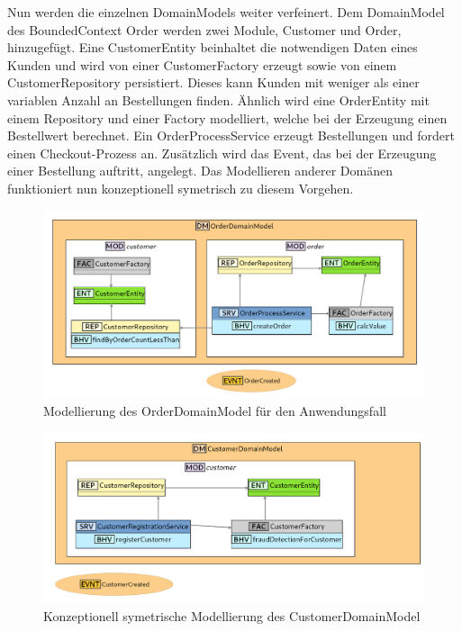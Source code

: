 \newpage

Nun werden die einzelnen DomainModels weiter verfeinert. Dem DomainModel des BoundedContext Order werden zwei Module, \glqq Customer\grqq{} und \glqq Order\grqq, hinzugefügt. Eine \glqq CustomerEntity\grqq{} beinhaltet die notwendigen Daten eines Kunden und wird von einer \glqq CustomerFactory\grqq{} erzeugt sowie von einem \glqq CustomerRepository\grqq{} persistiert. Dieses kann Kunden mit weniger als einer variablen Anzahl an Bestellungen finden. Ähnlich wird eine \glqq OrderEntity\grqq{} mit einem Repository und einer Factory modelliert, welche bei der Erzeugung einen Bestellwert berechnet. Ein \glqq OrderProcessService\grqq{} erzeugt Bestellungen und fordert einen Checkout-Prozess an. Zusätzlich wird das Event, das bei der Erzeugung einer Bestellung auftritt, angelegt. Das Modellieren anderer Domänen funktioniert nun konzeptionell symetrisch zu diesem Vorgehen.

\begin{figure}[ht]
\centering
\includegraphics[width=\textwidth]{bilder/k6/3.png}
\caption{Modellierung des OrderDomainModel für den Anwendungsfall}
\end{figure}

\begin{figure}[ht]
\centering
\includegraphics[width=\textwidth]{bilder/k6/extra.png}
\caption{Konzeptionell symetrische Modellierung des CustomerDomainModel}
\end{figure}



